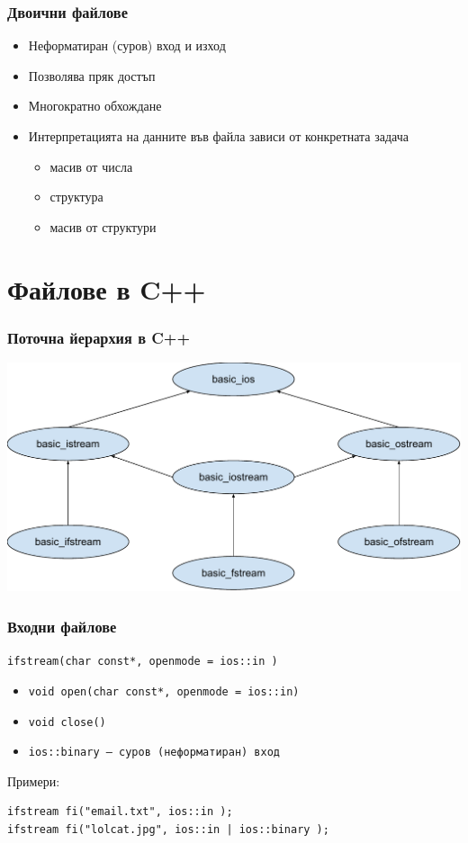 \documentclass{beamer}
\begin{document}
\begin{frame}
  \frametitle{Двоични файлове}
  \begin{itemize}
  \item Неформатиран (суров) вход и изход
  \item Позволява пряк достъп
  \item Многократно обхождане
  \item Интерпретацията на данните във файла зависи от конкретната задача
    \begin{itemize}
    \item  масив от числа
    \item структура
    \item масив от структури
    \end{itemize}
  \end{itemize}
\end{frame}

\section{Файлове в C++}

\begin{frame}
  \frametitle{Поточна йерархия в C++}

  \includegraphics[width=\textwidth]{images/stream_hierarchy.pdf}
\end{frame}

\begin{frame}[fragile]
  \frametitle{Входни файлове}

  \verb#ifstream(char const*, openmode = ios::in )#
  \vspace{1em}

  \begin{itemize}
  \item \verb#void open(char const*, openmode = ios::in)#
  \item \verb#void close()#
  \item \tt{ios::binary} — суров (неформатиран) вход
  \end{itemize}
  \vspace{3em}

  Примери:
\begin{verbatim}
ifstream fi("email.txt", ios::in );
ifstream fi("lolcat.jpg", ios::in | ios::binary );
\end{verbatim}
\end{frame}
\end{document}
